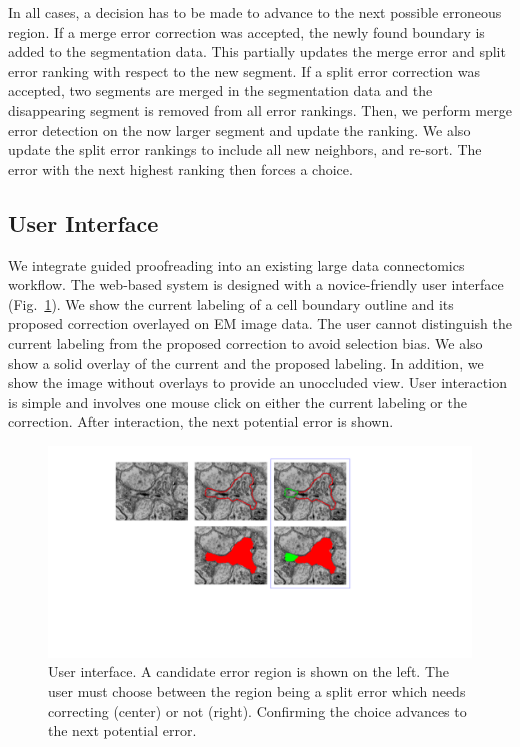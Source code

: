 \noindent \newline In all cases, a decision has to be made to advance to the next possible erroneous region. If a merge error correction was accepted, the newly found boundary is added to the segmentation data. This partially updates the merge error and split error ranking with respect to the new segment. If a split error correction was accepted, two segments are merged in the segmentation data and the disappearing segment is removed from all error rankings. Then, we perform merge error detection on the now larger segment and update the ranking. We also update the split error rankings to include all new neighbors, and re-sort. The error with the next highest ranking then forces a choice.

\subsection{User Interface}

We integrate guided proofreading into an existing large data connectomics workflow. The web-based system is designed with a novice-friendly user interface (Fig.~\ref{fig:ui}). We show the current labeling of a cell boundary outline and its proposed correction overlayed on EM image data. The user cannot distinguish the current labeling from the proposed correction to avoid selection bias. We also show a solid overlay of the current and the proposed labeling. In addition, we show the image without overlays to provide an unoccluded view. User interaction is simple and involves one mouse click on either the current labeling or the correction. After interaction, the next potential error is shown.

\begin{figure}[t]
\includegraphics[width=\linewidth]{gfx/user_interface_split.pdf}
\caption{User interface. A candidate error region is shown on the left. The user must choose between the region being a split error which needs correcting (center) or not (right). Confirming the choice advances to the next potential error.} %
\label{fig:ui}
\end{figure}

